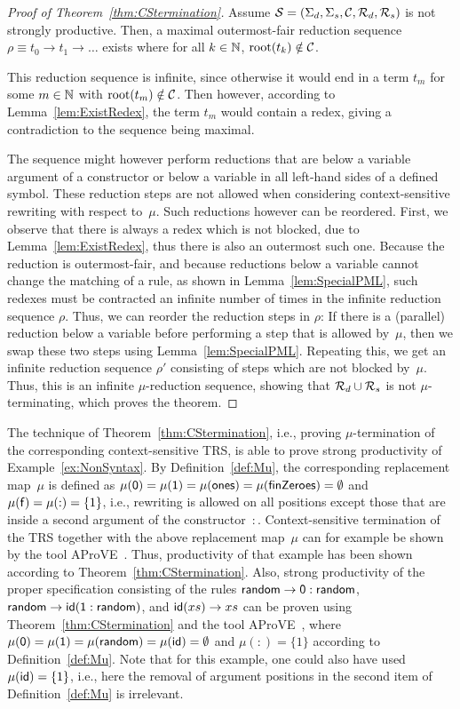 \documentclass{eptcs}
\begin{document}
\begin{proof}[Proof of Theorem~\ref{thm:CStermination}]
Assume $\mathcal{S} = (\Sigma_d,\Sigma_s,\mathcal{C},\mathcal{R}_d,\mathcal{R}_s)$ is not strongly productive.
Then, a maximal outermost-fair reduction sequence
$\rho \equiv t_0 \to t_1 \to \dots$ exists where for all
$k \in \mathbb{N}$, $\mathrm{root}(t_k) \notin \mathcal{C}$.

This reduction sequence is infinite, since otherwise it would end in a term
$t_m$ for some $m \in \mathbb{N}$ with $\mathrm{root}(t_m) \notin \mathcal{C}$. Then however, according
to Lemma~\ref{lem:ExistRedex}, the term $t_m$ would contain a redex, giving a
contradiction to the sequence being maximal.

The sequence might however perform reductions that are below a variable argument
of a constructor or below a variable in all left-hand sides of a defined symbol.
These reduction steps are not allowed when considering context-sensitive
rewriting with respect to~$\mu$. Such reductions however can be reordered.
First, we observe that there is always a redex which is not blocked, due to 
Lemma~\ref{lem:ExistRedex}, thus there is also an outermost such one. Because
the reduction is outermost-fair, and because reductions below a variable cannot
change the matching of a rule, as shown in Lemma~\ref{lem:SpecialPML}, such
redexes must be contracted an infinite number of times in the infinite reduction
sequence $\rho$. Thus, we can reorder the reduction steps in $\rho$:
If there is a (parallel) reduction below a variable before performing a step
that is allowed by~$\mu$, then we swap these two steps using
Lemma~\ref{lem:SpecialPML}. Repeating this, we get an infinite reduction
sequence $\rho'$ consisting of steps which are not blocked by~$\mu$. Thus, this
is an infinite $\mu$-reduction sequence, showing that $\mathcal{R}_d \cup \mathcal{R}_s$ is not
$\mu$-terminating, which proves the theorem.
\end{proof}

The technique of Theorem~\ref{thm:CStermination}, i.e., proving
$\mu$-termination of the corresponding context-sensitive TRS, is able to prove
strong productivity of Example~\ref{ex:NonSyntax}. By Definition~\ref{def:Mu},
the corresponding replacement map~$\mu$ is defined as
$\mu(\mathsf{0}) = \mu(\mathsf{1}) = \mu(\mathsf{ones}) = \mu(\mathsf{finZeroes}) =
\emptyset$ and
$\mu(\mathsf{f}) = \mu(\mathsf{:}) = \{ 1 \}$, i.e., rewriting is allowed on all
positions except those that are inside a second argument of the
constructor~$:$.
Context-sensitive termination of the TRS together with the above replacement
map~$\mu$ can for example be shown by the tool AProVE~\cite{AProVE06}.
Thus, productivity of that example has been shown according to
Theorem~\ref{thm:CStermination}.
Also, strong productivity of the proper specification consisting of the rules
$\mathsf{random} \to \mathsf{0} : \mathsf{random}$,
$\mathsf{random} \to \mathsf{id}(\mathsf{1} : \mathsf{random})$, and $\mathsf{id}(xs) \to xs$
can be proven using Theorem~\ref{thm:CStermination} and the tool
AProVE~\cite{AProVE06}, where
$\mu(\mathsf{0}) = \mu(\mathsf{1}) = \mu(\mathsf{random}) = \mu(\mathsf{id}) = \emptyset$
and $\mu(:) = \{ 1 \}$
according to Definition~\ref{def:Mu}.
Note that for this example, one could also have used $\mu(\mathsf{id}) = \{ 1 \}$,
i.e., here the removal of argument positions in the second item of
Definition~\ref{def:Mu} is irrelevant.
\end{document}
